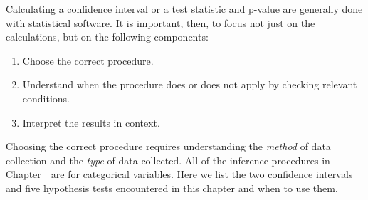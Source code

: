 \noindent Calculating a confidence interval or a test statistic and p-value are generally done with statistical software.  It is important, then, to focus not just on the calculations, but on the following components:
\begin{enumerate}\vspace{-1mm}
\setlength{\itemsep}{0mm}
\item Choose the correct procedure.
\item Understand when the procedure does or does not apply by checking relevant conditions.
\item Interpret the results in context.
\end{enumerate}
Choosing the correct procedure requires understanding the \textit{method} of data collection and the \textit{type} of data collected. All of the inference procedures in Chapter~\thechapter~are for categorical variables.  Here we list the two confidence intervals and five hypothesis tests encountered in this chapter and when to use them.  
